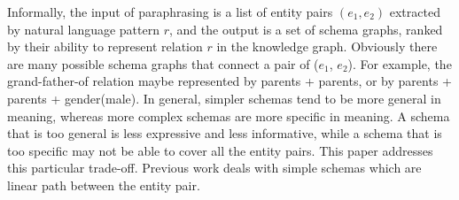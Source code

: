 Informally, the input of paraphrasing is a list of entity pairs $(e_1, e_2)$
extracted by natural language pattern $r$, and the output is a set of 
schema graphs, ranked by their ability to represent relation $r$ in the 
knowledge graph. Obviously there are many possible schema graphs that
connect a pair of ($e_1$, $e_2$). For example, the grand-father-of relation 
maybe represented by parents + parents, or by parents + parents + gender(male). 
In general, simpler schemas tend to be more general in meaning, whereas
more complex schemas are more specific in meaning. A schema that is too general
is less expressive and less informative, while a schema that is too specific 
may not be able to cover all the entity pairs. This paper addresses this
particular trade-off.  
Previous work \cite{lao2010relational,lao2011random,zhang2012ontological} 
deals with simple schemas which are linear path between the entity pair. 

%



%
%


